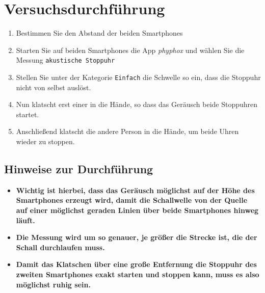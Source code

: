 \documentclass[12pt,oneside]{scrartcl}
\newcommand{\phyphox}{\textit{phyphox} }
\begin{document}
\section*{Versuchsdurchführung}
\begin{enumerate}
\item Bestimmen Sie den Abstand der beiden Smartphones
\item Starten Sie auf beiden Smartphones die App \phyphox und wählen Sie die Messung \texttt{akustische Stoppuhr}
\item Stellen Sie unter der Kategorie \texttt{Einfach} die Schwelle so ein, dass die Stoppuhr nicht von selbst auslöst.
\item Nun klatscht erst einer in die Hände, so dass das Geräusch beide Stoppuhren startet.
\item Anschließend klatscht die andere Person in die Hände, um beide Uhren wieder zu stoppen.
\end{enumerate}
\subsection*{Hinweise zur Durchführung}
\begin{itemize}
\item \textbf{Wichtig ist hierbei, dass das Geräusch möglichst auf der Höhe des Smartphones erzeugt wird, damit die Schallwelle von der Quelle auf einer möglichst geraden Linien über beide Smartphones hinweg läuft.}
\item \textbf{Die Messung wird um so genauer, je größer die Strecke ist, die der Schall durchlaufen muss.}
\item \textbf{Damit das Klatschen über eine große Entfernung die Stoppuhr des zweiten Smartphones exakt starten und stoppen kann, muss es also möglichst ruhig sein.}
\end{itemize}
\end{document}
